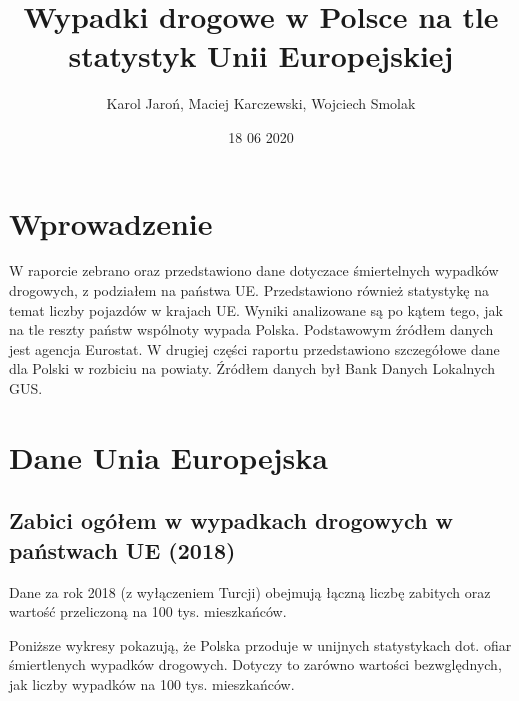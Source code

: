 \documentclass[
]{article}
\title{Wypadki drogowe w Polsce na tle statystyk Unii Europejskiej}
\author{Karol Jaroń, Maciej Karczewski, Wojciech Smolak}
\date{18 06 2020}
\begin{document}
\maketitle

\hypertarget{wprowadzenie}{%
\section{Wprowadzenie}\label{wprowadzenie}}

W raporcie zebrano oraz przedstawiono dane dotyczace śmiertelnych
wypadków drogowych, z podziałem na państwa UE. Przedstawiono również
statystykę na temat liczby pojazdów w krajach UE. Wyniki analizowane są
po kątem tego, jak na tle reszty państw wspólnoty wypada Polska.
Podstawowym źródłem danych jest agencja Eurostat. W drugiej części
raportu przedstawiono szczegółowe dane dla Polski w rozbiciu na powiaty.
Źródłem danych był Bank Danych Lokalnych GUS.

\hypertarget{dane-unia-europejska}{%
\section{Dane Unia Europejska}\label{dane-unia-europejska}}

\hypertarget{zabici-oguxf3ux142em-w-wypadkach-drogowych-w-paux144stwach-ue-2018}{%
\subsection{Zabici ogółem w wypadkach drogowych w państwach UE
(2018)}\label{zabici-oguxf3ux142em-w-wypadkach-drogowych-w-paux144stwach-ue-2018}}

Dane za rok 2018 (z wyłączeniem Turcji) obejmują łączną liczbę zabitych
oraz wartość przeliczoną na 100 tys. mieszkańców.

Poniższe wykresy pokazują, że Polska przoduje w unijnych statystykach
dot. ofiar śmiertlenych wypadków drogowych. Dotyczy to zarówno wartości
bezwględnych, jak liczby wypadków na 100 tys. mieszkańców.
\end{document}
